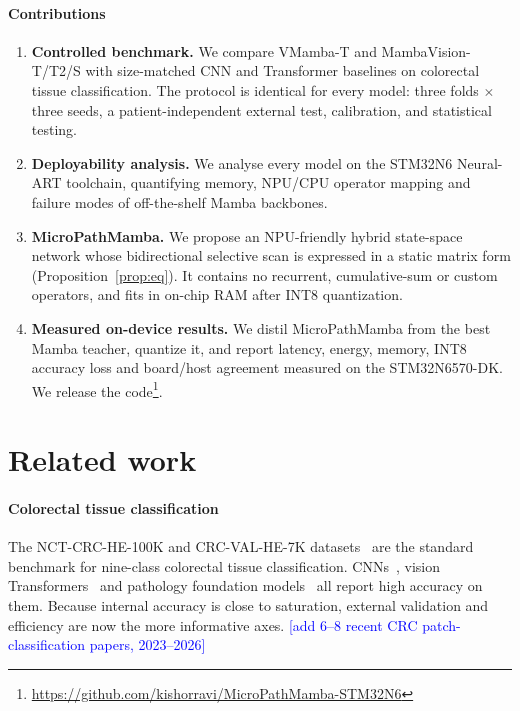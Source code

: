 \documentclass[preprint,12pt]{elsarticle}
\newcommand{\todo}[1]{\textcolor{blue}{[#1]}}
\begin{document}
\paragraph{Contributions}
\begin{enumerate}
\item \textbf{Controlled benchmark.} We compare VMamba-T and MambaVision-T/T2/S with size-matched CNN and Transformer baselines on colorectal tissue classification. The protocol is identical for every model: three folds $\times$ three seeds, a patient-independent external test, calibration, and statistical testing.
\item \textbf{Deployability analysis.} We analyse every model on the STM32N6 Neural-ART toolchain, quantifying memory, NPU/CPU operator mapping and failure modes of off-the-shelf Mamba backbones.
\item \textbf{MicroPathMamba.} We propose an NPU-friendly hybrid state-space network whose bidirectional selective scan is expressed in a static matrix form (Proposition~\ref{prop:eq}). It contains no recurrent, cumulative-sum or custom operators, and fits in on-chip RAM after INT8 quantization.
\item \textbf{Measured on-device results.} We distil MicroPathMamba from the best Mamba teacher, quantize it, and report latency, energy, memory, INT8 accuracy loss and board/host agreement measured on the STM32N6570-DK. We release the code\footnote{\url{https://github.com/kishorravi/MicroPathMamba-STM32N6}}.
\end{enumerate}

\section{Related work}
\paragraph{Colorectal tissue classification}
The NCT-CRC-HE-100K and CRC-VAL-HE-7K datasets~\cite{kather2019} are the standard benchmark for nine-class colorectal tissue classification. CNNs~\cite{he2016resnet}, vision Transformers~\cite{dosovitskiy2021vit,liu2021swin} and pathology foundation models~\cite{chen2024uni} all report high accuracy on them. Because internal accuracy is close to saturation, external validation and efficiency are now the more informative axes. \todo{add 6--8 recent CRC patch-classification papers, 2023--2026}
\end{document}
